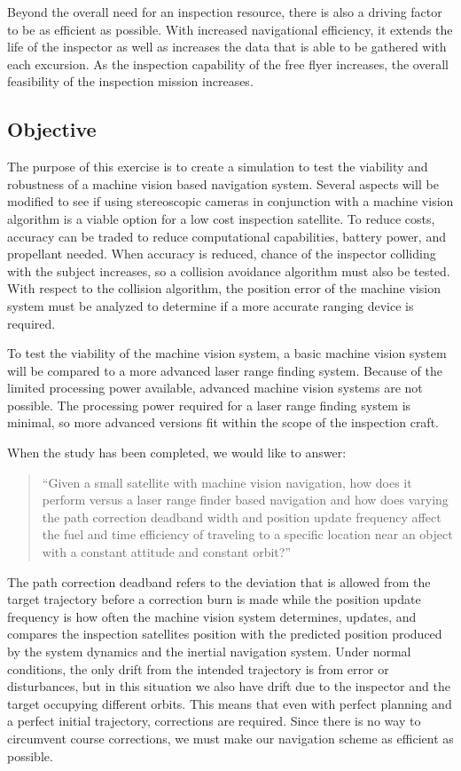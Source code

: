 \documentclass[journal, 10pt]{IEEEtran}
\begin{document}
Beyond the overall need for an inspection resource, there is also a driving factor to be as efficient as possible.  With increased navigational efficiency, it extends the life of the inspector as well as increases the data that is able to be gathered with each excursion.  As the inspection capability of the free flyer increases, the overall feasibility of the inspection mission increases.


\subsection{Objective}
The purpose of this exercise is to create a simulation to test the viability and robustness of a machine vision based navigation system.  Several aspects will be modified to see if using stereoscopic cameras in conjunction with a machine vision algorithm is a viable option for a low cost inspection satellite.  To reduce costs, accuracy can be traded to reduce computational capabilities, battery power, and propellant needed.  When accuracy is reduced, chance of the inspector colliding with the subject increases, so a collision avoidance algorithm must also be tested.  With respect to the collision algorithm, the position error of the machine vision system must be analyzed to determine if a more accurate ranging device is required.

To test the viability of the machine vision system, a basic machine vision system will be compared to a more advanced laser range finding system.  Because of the limited processing power available, advanced machine vision systems are not possible.  The processing power required for a laser range finding system is minimal, so more advanced versions fit within the scope of the inspection craft.

When the study has been completed, we would like to answer:

\begin{quote}
``Given a small satellite with machine vision navigation, how does it perform versus a laser range finder based navigation and how does varying the path correction deadband width and position update frequency affect the fuel and time efficiency of traveling to a specific location near an object with a constant attitude and constant orbit?''
\end{quote}

The path correction deadband refers to the deviation that is allowed from the target trajectory before a correction burn is made while the position update frequency is how often the machine vision system determines, updates, and compares the inspection satellites position with the predicted position produced by the system dynamics and the inertial navigation system.  Under normal conditions, the only drift from the intended trajectory is from error or disturbances, but in this situation we also have drift due to the inspector and the target occupying different orbits.  This means that even with perfect planning and a perfect initial trajectory, corrections are required.  Since there is no way to circumvent course corrections, we must make our navigation scheme as efficient as possible.
\end{document}
